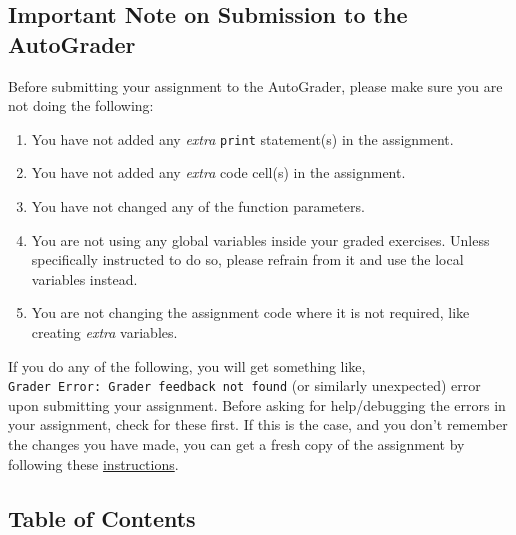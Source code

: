 \documentclass[11pt]{article}
\providecommand{\tightlist}{%
      \setlength{\itemsep}{0pt}\setlength{\parskip}{0pt}}
\begin{document}
\hypertarget{important-note-on-submission-to-the-autograder}{%
\subsection{Important Note on Submission to the
AutoGrader}\label{important-note-on-submission-to-the-autograder}}

Before submitting your assignment to the AutoGrader, please make sure
you are not doing the following:

\begin{enumerate}
\def\labelenumi{\arabic{enumi}.}
\tightlist
\item
  You have not added any \emph{extra} \texttt{print} statement(s) in the
  assignment.
\item
  You have not added any \emph{extra} code cell(s) in the assignment.
\item
  You have not changed any of the function parameters.
\item
  You are not using any global variables inside your graded exercises.
  Unless specifically instructed to do so, please refrain from it and
  use the local variables instead.
\item
  You are not changing the assignment code where it is not required,
  like creating \emph{extra} variables.
\end{enumerate}

If you do any of the following, you will get something like,
\texttt{Grader\ Error:\ Grader\ feedback\ not\ found} (or similarly
unexpected) error upon submitting your assignment. Before asking for
help/debugging the errors in your assignment, check for these first. If
this is the case, and you don't remember the changes you have made, you
can get a fresh copy of the assignment by following these
\href{https://www.coursera.org/learn/nlp-sequence-models/supplement/qHIve/h-ow-to-refresh-your-workspace}{instructions}.

    \hypertarget{table-of-contents}{%
\subsection{Table of Contents}\label{table-of-contents}}
\end{document}
